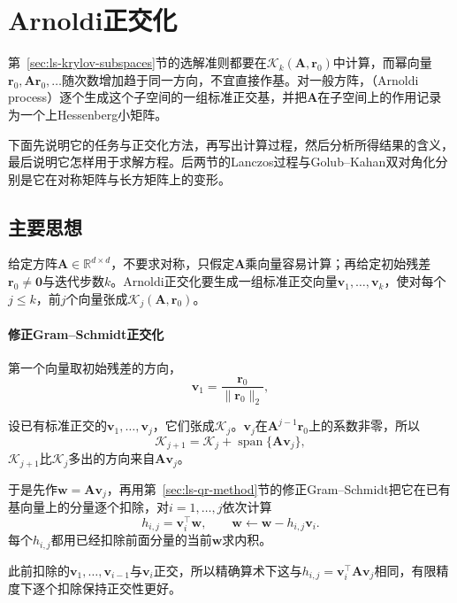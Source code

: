 \section{Arnoldi正交化}
\label{sec:ls-arnoldi}

第~\ref{sec:ls-krylov-subspaces}节的选解准则都要在$\mathcal K_k(\bm A,\bm r_0)$中计算，而幂向量$\bm r_0,\bm A\bm r_0,\ldots$随次数增加趋于同一方向，不宜直接作基。对一般方阵，（Arnoldi process）逐个生成这个子空间的一组标准正交基，并把$\bm A$在子空间上的作用记录为一个上Hessenberg小矩阵。

下面先说明它的任务与正交化方法，再写出计算过程，然后分析所得结果的含义，最后说明它怎样用于求解方程。后两节的Lanczos过程与Golub--Kahan双对角化分别是它在对称矩阵与长方矩阵上的变形。

\subsection{主要思想}

给定方阵$\bm A\in\mathbb R^{d\times d}$，不要求对称，只假定$\bm A$乘向量容易计算；再给定初始残差$\bm r_0\ne\bm 0$与迭代步数$k$。Arnoldi正交化要生成一组标准正交向量$\bm v_1,\ldots,\bm v_k$，使对每个$j\le k$，前$j$个向量张成$\mathcal K_j(\bm A,\bm r_0)$。

\paragraph{修正Gram--Schmidt正交化}

第一个向量取初始残差的方向，
\begin{equation}
 \bm v_1=\frac{\bm r_0}{\lVert\bm r_0\rVert_2},
 \label{eq:ls-arnoldi-start}
\end{equation}

设已有标准正交的$\bm v_1,\ldots,\bm v_j$，它们张成$\mathcal K_j$。$\bm v_j$在$\bm A^{j-1}\bm r_0$上的系数非零，所以
\[
  \mathcal K_{j+1}=\mathcal K_j+\operatorname{span}\{\bm A\bm v_j\} ,
\]
$\mathcal K_{j+1}$比$\mathcal K_j$多出的方向来自$\bm A\bm v_j$。

于是先作$\bm w=\bm A\bm v_j$，再用第~\ref{sec:ls-qr-method}节的修正Gram--Schmidt把它在已有基向量上的分量逐个扣除，对$i=1,\ldots,j$依次计算
\begin{equation}
 h_{i,j}=\bm v_i^\top\bm w,\qquad \bm w\leftarrow\bm w-h_{i,j}\bm v_i .
 \label{eq:ls-arnoldi-coefficients}
\end{equation}
每个$h_{i,j}$都用已经扣除前面分量的当前$\bm w$求内积。

此前扣除的$\bm v_1,\ldots,\bm v_{i-1}$与$\bm v_i$正交，所以精确算术下这与$h_{i,j}=\bm v_i^\top\bm A\bm v_j$相同，有限精度下逐个扣除保持正交性更好。

